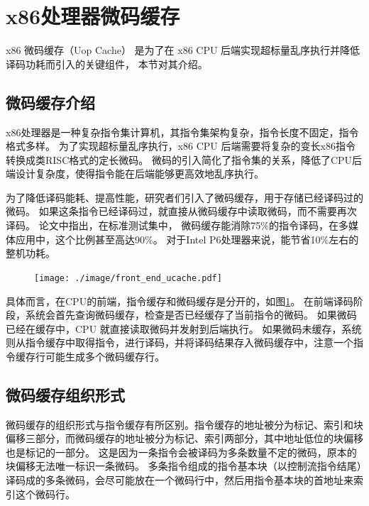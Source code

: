 \section{x86处理器微码缓存}\label{sec:complex_isa}

x86 微码缓存（Uop Cache）
是为了在 x86 CPU 后端实现超标量乱序执行并降低译码功耗而引入的关键组件\cite{solomonMicrooperationCachePower2001}，
本节对其介绍。

\subsection{微码缓存介绍}

x86处理器是一种复杂指令集计算机，其指令集架构复杂，指令长度不固定，指令格式多样。
为了实现超标量乱序执行，x86 CPU 后端需要将复杂的变长x86指令转换成类RISC格式的定长微码。
微码的引入简化了指令集的关系，降低了CPU后端设计复杂度，使得指令能在后端能够更高效地乱序执行。

为了降低译码能耗、提高性能，研究者们引入了微码缓存，用于存储已经译码过的微码。
如果这条指令已经译码过，就直接从微码缓存中读取微码，而不需要再次译码。
\cite{solomonMicrooperationCachePower2001}论文中指出，在标准测试集中，
微码缓存能消除75\%的指令译码，在多媒体应用中，这个比例甚至高达90\%。
对于Intel P6处理器来说，能节省10\%左右的整机功耗。

\begin{figure}[!htbp]
  \centering
  \texttt{[image: ./image/front\_end\_ucache.pdf]}
  \label{img:front_end_ucache}
\end{figure}

具体而言，在CPU的前端，指令缓存和微码缓存是分开的，如图\ref{img:front_end_ucache}。
在前端译码阶段，系统会首先查询微码缓存，检查是否已经缓存了当前指令的微码。
如果微码已经在缓存中，CPU 就直接读取微码并发射到后端执行。
如果微码未缓存，系统则从指令缓存中取得指令，进行译码，并将译码结果存入微码缓存中，注意一个指令缓存行可能生成多个微码缓存行。

\subsection{微码缓存组织形式}

微码缓存的组织形式与指令缓存有所区别。指令缓存的地址被分为标记、索引和块偏移三部分，而微码缓存的地址被分为标记、索引两部分，其中地址低位的块偏移也是标记的一部分。
这是因为一条指令会被译码为多条数量不定的微码，原本的块偏移无法唯一标识一条微码。
多条指令组成的指令基本块（以控制流指令结尾）译码成的多条微码，会尽可能放在一个微码行中，然后用指令基本块的首地址来索引这个微码行。

